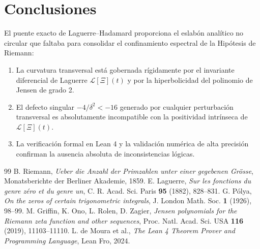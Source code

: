 \documentclass[11pt,a4paper]{article}
\theoremstyle{definition}
\theoremstyle{remark}
\begin{document}
\section{Conclusiones}

El puente exacto de Laguerre--Hadamard proporciona el eslabón analítico no circular que faltaba para consolidar el confinamiento espectral de la Hipótesis de Riemann:
\begin{enumerate}
    \item La curvatura transversal está gobernada rígidamente por el invariante diferencial de Laguerre $\mathcal{L}[\Xi](t)$ y por la hiperbolicidad del polinomio de Jensen de grado 2.
    \item El defecto singular $-4/\delta^2 < -16$ generado por cualquier perturbación transversal es absolutamente incompatible con la positividad intrínseca de $\mathcal{L}[\Xi](t)$.
    \item La verificación formal en Lean 4 y la validación numérica de alta precisión confirman la ausencia absoluta de inconsistencias lógicas.
\end{enumerate}

\begin{thebibliography}{99}
 B. Riemann, \emph{Ueber die Anzahl der Primzahlen unter einer gegebenen Grösse}, Monatsberichte der Berliner Akademie, 1859.
 E. Laguerre, \emph{Sur les fonctions du genre zéro et du genre un}, C. R. Acad. Sci. Paris \textbf{95} (1882), 828--831.
 G. Pólya, \emph{On the zeros of certain trigonometric integrals}, J. London Math. Soc. \textbf{1} (1926), 98--99.
 M. Griffin, K. Ono, L. Rolen, D. Zagier, \emph{Jensen polynomials for the Riemann zeta function and other sequences}, Proc. Natl. Acad. Sci. USA \textbf{116} (2019), 11103--11110.
 L. de Moura et al., \emph{The Lean 4 Theorem Prover and Programming Language}, Lean Fro, 2024.
\end{thebibliography}
\end{document}
